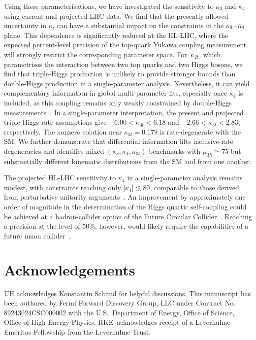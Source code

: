 \documentclass{SciPost}
\begin{document}
Using these parameterisations, we have investigated the sensitivity to $\kappa_3$ and $\kappa_4$ using current and projected LHC data. We find that the presently allowed uncertainty in $\kappa_t$ can have a substantial impact on the constraints in the $\kappa_3\hspace{0.25mm}$--$\hspace{0.25mm}\kappa_4$ plane. This dependence is significantly reduced at the HL-LHC, where the expected percent-level precision of the top-quark Yukawa coupling measurement will strongly restrict the corresponding parameter space. For~$\kappa_{2t}$, which parametrises the interaction between two top quarks and two Higgs bosons, we find that triple-Higgs production is unlikely to provide stronger bounds than double-Higgs production in a single-parameter analysis. Nevertheless, it can yield complementary information in global multi-parameter fits, especially once $\kappa_4$ is included, as this coupling remains only weakly constrained by double-Higgs measurements~\cite{Bizon:2018syu,Borowka:2018pxx,Li:2024iio,Ding:2026qto}. In a single-parameter interpretation, the present and projected triple-Higgs rate assumptions give $-6.00<\kappa_{3t}<6.18$ and $-2.66<\kappa_{3t}<2.83$, respectively. The nonzero solution near $\kappa_{3t}=0.179$ is rate-degenerate with the SM. We further demonstrate that differential information lifts inclusive-rate degeneracies and identifies mixed $(\kappa_3,\kappa_4,\kappa_{3t})$ benchmarks with $\mu_{3h}\simeq75$ but substantially different kinematic distributions from the SM and from one another.

The projected HL-LHC sensitivity to $\kappa_4$ in a single-parameter analysis remains modest, with constraints reaching only $|\kappa_4|\lesssim 80$, comparable to those derived from perturbative unitarity arguments~\cite{Liu:2018peg,Stylianou:2023xit,DiLuzio:2017tfn}. An improvement by approximately one order of magnitude in the determination of the Higgs quartic self-coupling could be achieved at a hadron-collider option of the Future Circular Collider~\cite{Papaefstathiou:2015paa,Chen:2015gva,Fuks:2015hna,Kilian:2017nio,Fuks:2017zkg,Bizon:2018syu,Papaefstathiou:2023uum,Abouabid:2024gms,Dong:2025lkm,Haisch:2025pql,Fuks:2025gjv}. Reaching a precision at the level of $50\%$, however, would likely require the capabilities of a future muon collider~\cite{Chiesa:2020awd}.

\section*{Acknowledgements}
UH acknowledges Konstantin Schmid for helpful discussions. This manuscript has been authored by Fermi Forward Discovery Group, LLC under Contract No. 89243024CSC000002 with the U.S.\ Department of Energy, Office of Science, Office of High Energy Physics. RKE~acknowledges receipt of a Leverhulme Emeritus Fellowship from the Leverhulme Trust.
\end{document}
